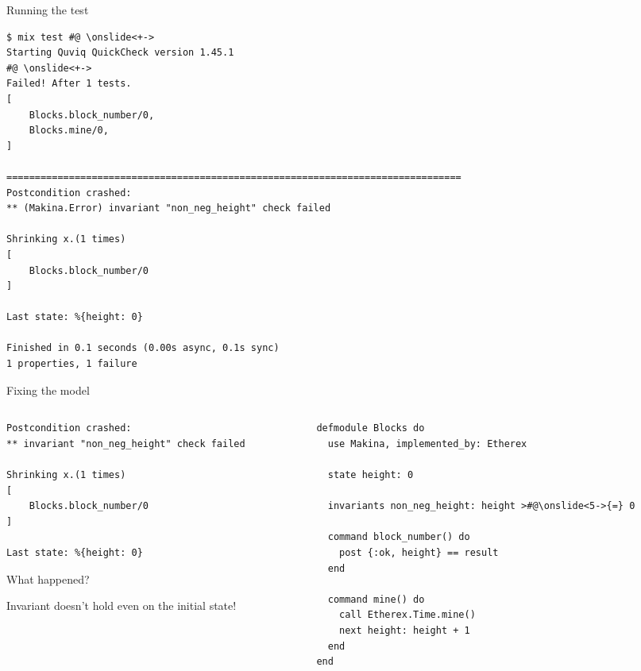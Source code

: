 \documentclass[aspectratio=169, 10pt]{beamer}
\begin{document}
\begin{frame}[label={sec:orgf18ed96},fragile]{Running the test}
 \onslide<+->
\onslide<+->
\lstset{language=bash,label= ,caption= ,captionpos=b,numbers=none,style=shell}
\begin{lstlisting}
$ mix test #@ \onslide<+->
Starting Quviq QuickCheck version 1.45.1
#@ \onslide<+->
Failed! After 1 tests.
[
    Blocks.block_number/0,
    Blocks.mine/0,
]

================================================================================
Postcondition crashed:
** (Makina.Error) invariant "non_neg_height" check failed

Shrinking x.(1 times)
[
    Blocks.block_number/0
]

Last state: %{height: 0}

Finished in 0.1 seconds (0.00s async, 0.1s sync)
1 properties, 1 failure
\end{lstlisting}
\end{frame}

\begin{frame}[label={sec:orgb0eb6b1},fragile]{Fixing the model}
 \begin{columns}
\begin{column}{0.48\columnwidth}
\onslide<+->
\onslide<+->
\lstset{language=bash,label= ,caption= ,captionpos=b,numbers=none,style=shell}
\begin{lstlisting}
Postcondition crashed:
** invariant "non_neg_height" check failed

Shrinking x.(1 times)
[
    Blocks.block_number/0
]

Last state: %{height: 0}
\end{lstlisting}

\onslide<+->
What happened?

\vspace{10pt}
\onslide<+->
Invariant doesn't hold even on the initial state!
\end{column}

\begin{column}{0.48\columnwidth}
\lstset{language=elixir,label= ,caption= ,captionpos=b,numbers=none,style=display}
\begin{lstlisting}
defmodule Blocks do
  use Makina, implemented_by: Etherex

  state height: 0

  invariants non_neg_height: height >#@\onslide<5->{=} 0

  command block_number() do
    post {:ok, height} == result
  end

  command mine() do
    call Etherex.Time.mine()
    next height: height + 1
  end
end
\end{lstlisting}
\end{column}
\end{columns}
\end{frame}
\end{document}

